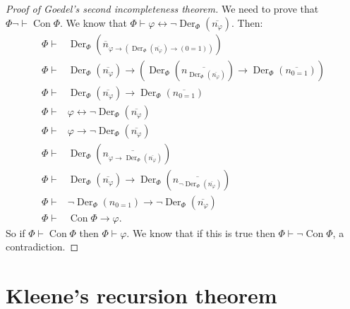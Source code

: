 \documentclass[12pt]{report}
\DeclareMathOperator{\Der}{Der}
\renewcommand{\iff}{\leftrightarrow}
\newcommand{\proves}{\vdash}
\DeclareMathOperator{\Con}{Con}
\theoremstyle{definition}
\begin{document}
\begin{proof}[Proof of Goedel's second incompleteness theorem]
We need to prove that $\Phi \neg\proves \Con \Phi$. We know that $\Phi \proves \varphi \iff \neg \Der_\Phi(\overline{n_\varphi})$.
Then:
\begin{align*}
\Phi \proves &\Der_\Phi(\overline n_{\varphi \to (\Der_\Phi(\overline{n_\varphi}) \to (0=1))})\\
\Phi \proves &\Der_\Phi(\overline{n_\varphi}) \to (\Der_\Phi(\overline{n_{\Der_\Phi(\overline{n_\varphi})}}) \to \Der_\Phi(\overline{n_{0=1}}))\\
\Phi \proves &\Der_\Phi(\overline{n_\varphi}) \to \Der_\Phi(\overline{n_{0=1}})\\
\Phi \proves &\varphi \iff \neg \Der_\Phi(\overline{n_\varphi})\\
\Phi \proves &\varphi \to \neg \Der_\Phi(\overline{n_\varphi})\\
\Phi \proves &\Der_\Phi(\overline{n_{\varphi \to \Der_\Phi(\overline{n_\varphi})}})\\
\Phi \proves &\Der_\Phi(\overline{n_\varphi}) \to \Der_\Phi(\overline{n_{\neg \Der_\Phi(\overline{n_\varphi})}})\\
\Phi \proves &\neg\Der_\Phi(n_{0=1}) \to \neg \Der_\Phi(\overline{n_\varphi})\\
\Phi \proves &\Con \Phi \to \varphi.
\end{align*}
So if $\Phi \proves \Con \Phi$ then $\Phi \proves \varphi$. We know that if this is true then $\Phi \proves \neg\Con \Phi$, a contradiction.
\end{proof}

\chapter{Kleene's recursion theorem}
\end{document}
